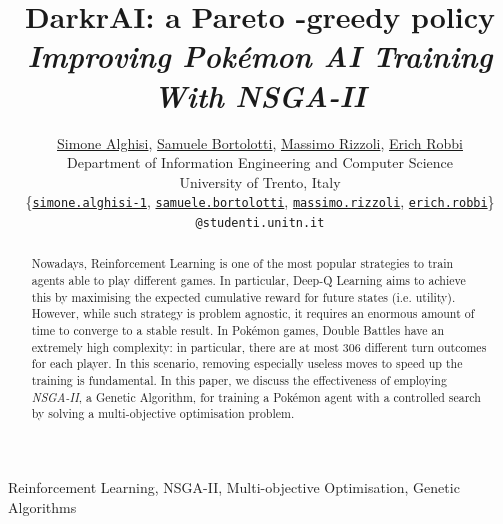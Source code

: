 \documentclass[journal]{IEEEtran}
\begin{document}
\title{\vspace{-0.5em}DarkrAI: a Pareto \bm{$\varepsilon$}-greedy policy\\[0.1em]\huge \textit{Improving Pokémon AI Training With NSGA-II}}
\author{\href{https://github.com/Simone-Alghisi}{Simone Alghisi}, \href{https://github.com/samuelebortolotti}{Samuele Bortolotti}, \href{https://github.com/massimo-rizzoli}{Massimo Rizzoli}, \href{https://github.com/erich-r}{Erich Robbi}\\Department of Information Engineering and Computer Science\\University of Trento, Italy\\

\normalsize\{\href{mailto:simone.alghisi-1@studenti.unitn.it}{\texttt{simone.alghisi-1}},  \href{mailto:samuele.bortolotti@studenti.unitn.it}{\texttt{samuele.bortolotti}}, \href{mailto:massimo.rizzoli@studenti.unitn.it}{\texttt{massimo.rizzoli}},  \href{mailto:erich.robbi@studenti.unitn.it}{\texttt{erich.robbi}}\} \texttt{@studenti.unitn.it}\vspace{-1em}}%

\maketitle

\begin{abstract}
Nowadays, Reinforcement Learning is one of the most popular strategies to train agents able to play different games. In particular, Deep-Q Learning aims to achieve this by maximising the expected cumulative reward for future states (i.e. utility). However, while such strategy is problem agnostic, it requires an enormous amount of time to converge to a stable result. In Pokémon games, Double Battles have an extremely high complexity: in particular, there are at most $306$ different turn outcomes for each player. In this scenario, removing especially useless moves to speed up the training is fundamental. In this paper, we discuss the effectiveness of employing \emph{NSGA-II}, a Genetic Algorithm, for training a Pokémon agent with a controlled search by solving a multi-objective optimisation problem.
\end{abstract}

\begin{IEEEkeywords}
Reinforcement Learning, NSGA-II, Multi-objective Optimisation, Genetic Algorithms
\end{IEEEkeywords}
\end{document}
